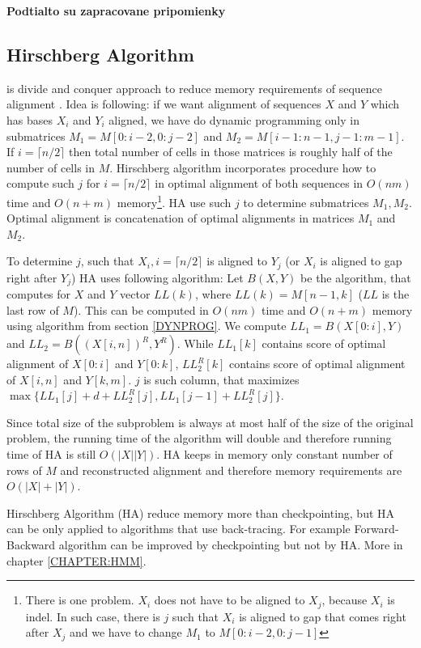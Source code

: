 \bigskip
{\Large\bf Podtialto su zapracovane pripomienky }
\bigskip


 
\subsection{Hirschberg Algorithm}

 is divide and conquer approach to reduce
memory requirements of sequence alignment \cite{Hirschberg1975}. Idea is
following: if we want alignment of sequences $X$ and $Y$ which has bases $X_i$
and $Y_i$ aligned, we have do dynamic programming only in submatrices
$M_1=M[0:i-2,0:j-2]$ and $M_2=M[i-1:n-1,j-1:m-1]$. If $i=\lceil n/2\rceil$ then
total number of cells in those matrices is roughly half of the number of cells
in $M$. Hirschberg algorithm incorporates procedure how to compute such $j$ for
$i=\lceil n/2\rceil$ in optimal alignment of both sequences in $O(nm)$ time and
$O(n+m)$ memory\footnote{There is one problem. $X_i$ does not have to be aligned
to $X_j$, because $X_i$ is indel. In such case, there is $j$ such that $X_i$ is
aligned to gap that comes right after $X_j$ and we have to change $M_1$ to
$M[0:i-2,0:j-1]$}. HA use such $j$ to determine submatrices $M_1,M_2$. Optimal
alignment is concatenation of optimal alignments in matrices $M_1$ and $M_2$.

To determine $j$, such that $X_i,i=\lceil n/2\rceil$ is aligned to $Y_j$ (or
$X_i$ is aligned to gap right after $Y_j$) HA uses following algorithm: Let
$B(X,Y)$ be the algorithm, that computes for $X$ and $Y$ vector $LL(k)$, where
$LL(k)=M[n-1,k]$ ($LL$ is the last row of $M$). This can be computed in
$O(nm)$ time and $O(n+m)$ memory using algorithm from section
\ref{DYNPROG}.  We compute $LL_1=B(X[0:i],Y)$ and $LL_2=B( (X[i,n])^R,Y^R)$.
While $LL_1[k]$ contains score of optimal alignment of $X[0:i]$ and $Y[0:k]$,
$LL_2^R[k]$ contains score of optimal alignment of $X[i,n]$ and $Y[k,m]$.
$j$ is such column, that maximizes $\max\{LL_1[j]+d+LL_2^R[j],
LL_1[j-1]+LL_2^R[j] \}$.

Since total size of the subproblem is always at most half of the size of the
original problem, the running time of the algorithm will double and therefore
running time of HA is still $O(|X||Y|)$. HA keeps in memory only constant number
of rows of $M$ and reconstructed alignment and therefore memory requirements are
$O(|X|+|Y|)$.

Hirschberg Algorithm (HA) reduce memory more than checkpointing, but HA can be
only applied to algorithms that use back-tracing. For example Forward-Backward
algorithm can be improved by checkpointing but not by HA. More in chapter
\ref{CHAPTER:HMM}.

